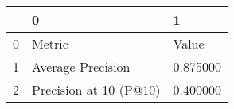 \begin{tabular}{lll}
\toprule
 & 0 & 1 \\
\midrule
0 & Metric & Value \\
1 & Average Precision & 0.875000 \\
2 & Precision at 10 (P@10) & 0.400000 \\
\bottomrule
\end{tabular}
